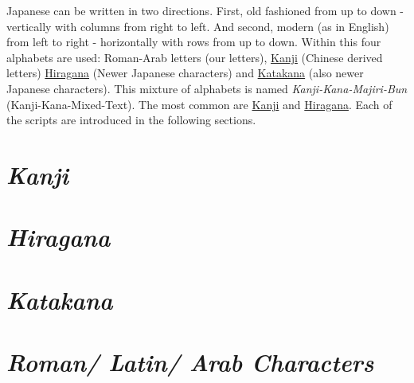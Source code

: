 Japanese can be written in two directions. First, old fashioned from up to down
- vertically with columns from right to left. And second, modern (as in
  English) from left to right - horizontally with rows from up to down. Within
  this four alphabets are used: Roman-Arab letters (our letters),
  \hyperref[sec:Kanji]{Kanji} (Chinese derived letters)
  \hyperref[sec:Hiragana]{Hiragana} (Newer Japanese characters) and
   \hyperref[sec:Katakana]{Katakana}  (also newer Japanese characters).  This
  mixture of alphabets is named \textit{Kanji-Kana-Majiri-Bun}
  (Kanji-Kana-Mixed-Text). The most common are \hyperref[sec:Kanji]{Kanji} and
  \hyperref[sec:Hiragana]{Hiragana}. Each of the scripts are introduced in the
  following sections.

\section*{\textit{Kanji}} 


\section*{\textit{Hiragana}}


\section*{\textit{Katakana}}


\section*{\textit{Roman/ Latin/ Arab Characters}}


